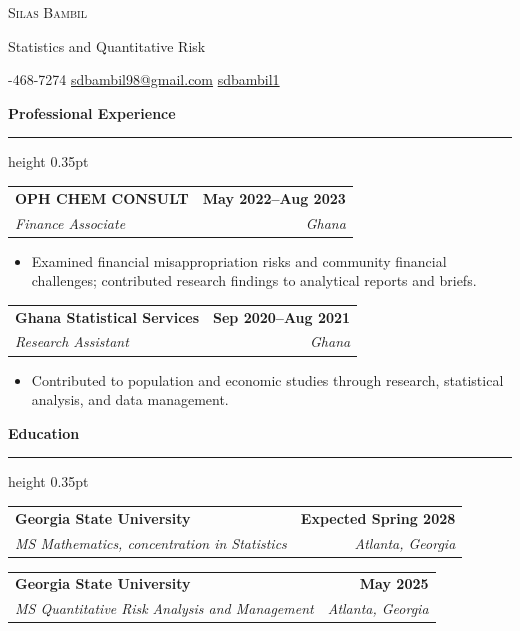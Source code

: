 \documentclass[11pt,letterpaper]{article}
\makeatletter
\newcommand{\phoneicon}{\faPhone\enspace}
\newcommand{\emailicon}{\faEnvelope\enspace}
\newcommand{\githubicon}{\faGithub\enspace}
\newcommand{\phoneicon}{}
\newcommand{\emailicon}{}
\newcommand{\githubicon}{GitHub:\enspace}
\newcommand{\cvsection}[1]{%
  \par\addvspace{4pt}
  {\large\bfseries #1}\par
  \nobreak\vspace{1pt}
  \hrule height 0.35pt
  \nobreak\vspace{3pt}
}
\newcommand{\entry}[4]{%
  \noindent\hspace*{6pt}%
  \begin{tabular*}{\dimexpr\textwidth-12pt\relax}
    {@{}l@{\extracolsep{\fill}}r@{}}
    {\normalsize\bfseries #1} & {\small\bfseries #2}\\
    {\small\itshape #3} & {\small\itshape #4}\\
  \end{tabular*}\par
}
\makeatother
\begin{document}

{\centering
  {\LARGE\scshape Silas Bambil}\par
  \vspace{2pt}
  {\normalsize Statistics and Quantitative Risk}\par
  \vspace{3pt}
  {\small
    \phoneicon 404-468-7274
    \quad
    \href{mailto:sdbambil98@gmail.com}{
      \emailicon sdbambil98@gmail.com}
    \quad
    \href{https://github.com/sdbambil1}{
      \githubicon sdbambil1}
  }\par
}
\vspace{4pt}

\small


\cvsection{Professional Experience}

\entry
  {OPH CHEM CONSULT}
  {May 2022--Aug 2023}
  {Finance Associate}
  {Ghana}

\begin{itemize}
  \item Examined financial misappropriation risks and
  community financial challenges; contributed research
  findings to analytical reports and briefs.
\end{itemize}

\vspace{2pt}

\entry
  {Ghana Statistical Services}
  {Sep 2020--Aug 2021}
  {Research Assistant}
  {Ghana}

\begin{itemize}
  \item Contributed to population and economic studies
  through research, statistical analysis, and data management.
\end{itemize}


\cvsection{Education}

\entry
  {Georgia State University}
  {Expected Spring 2028}
  {MS Mathematics, concentration in Statistics}
  {Atlanta, Georgia}

\vspace{2pt}

\entry
  {Georgia State University}
  {May 2025}
  {MS Quantitative Risk Analysis and Management}
  {Atlanta, Georgia}

\vspace{2pt}
\end{document}
